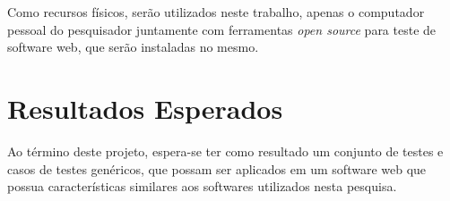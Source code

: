 \documentclass[12pt]{article}
\begin{document}
	Como recursos físicos, serão utilizados neste trabalho, apenas o computador pessoal do pesquisador juntamente
	com ferramentas \emph{open source} para teste de software web, que serão instaladas no mesmo.
	
	\section{Resultados Esperados}
	
	Ao término deste projeto, espera-se ter como resultado um conjunto de testes e casos de testes genéricos,
	que possam ser aplicados em um software web que possua características similares aos softwares utilizados
	nesta pesquisa.
	
	
	
	
\end{document}
